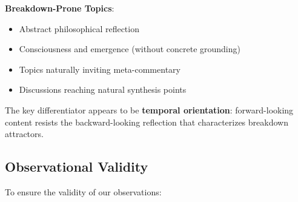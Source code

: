 \documentclass[11pt,letterpaper]{article}
\begin{document}
\textbf{Breakdown-Prone Topics}:
\begin{itemize}
    \item Abstract philosophical reflection
    \item Consciousness and emergence (without concrete grounding)
    \item Topics naturally inviting meta-commentary
    \item Discussions reaching natural synthesis points
\end{itemize}

The key differentiator appears to be \textbf{temporal orientation}: forward-looking content resists the backward-looking reflection that characterizes breakdown attractors.

\subsection{Observational Validity}

To ensure the validity of our observations:
\end{document}
